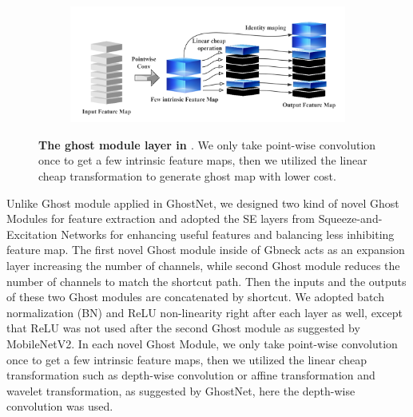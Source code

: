 \begin{figure}[h]
	\begin{center}
		
		\begin{subfigure}[b]{\textwidth}
		    \centering
			\includegraphics[width=\textwidth]{thesis-template-master/images/ghostmodule.png}
			
			\label{fig:cellnet}
		\end{subfigure}
	\end{center}
	\caption{\textbf{The ghost module layer in \cite{b19}}. We only take point-wise convolution once to get a few intrinsic feature maps, then we utilized the linear cheap transformation to generate ghost map with lower cost.}
\end{figure}

Unlike Ghost module applied in GhostNet\cite{b19}, we designed two kind of novel Ghost Modules for feature extraction and adopted the SE layers from Squeeze-and-Excitation Networks \cite{b24} for enhancing useful features and balancing less inhibiting feature map. The first novel Ghost module inside of Gbneck acts as an expansion layer increasing the number of channels, while second Ghost module reduces the number of channels to match the shortcut path. Then the inputs and the outputs of these two Ghost modules are concatenated by shortcut. We adopted batch normalization (BN) and ReLU non-linearity right after each layer as well\cite{b19}, except that ReLU was not used after the second Ghost module as suggested by MobileNetV2\cite{b30}. In each novel Ghost Module, we only take point-wise convolution once to get a few intrinsic feature maps, then we utilized the linear cheap transformation such as depth-wise convolution or affine transformation and wavelet transformation, as suggested by GhostNet\cite{b19}, here the depth-wise convolution was used.

